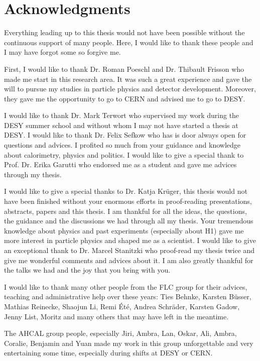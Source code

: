 \cleardoublepage
\thispagestyle{empty}
{}
\chapter*{Acknowledgments}

Everything leading up to this thesis would not have been possible without the continuous support of many people. Here, I would like to thank these people and I may have forgot some so forgive me.

First, I would like to thank Dr. Roman Poeschl and Dr. Thibault Frisson who made me start in this research area. It was such a great experience and gave the will to pursue my studies in particle physics and detector development. Moreover, they gave me the opportunity to go to CERN and advised me to go to DESY.

I would like to thank Dr. Mark Terwort who supervised my work during the DESY summer school and without whom I may not have started a thesis at DESY. I would like to thank Dr. Felix Sefkow who has is door always open for questions and advices. I profited so much from your guidance and knowledge about calorimetry, physics and politics. I would like to give a special thank to Prof. Dr. Erika Garutti who endorsed me as a student and gave me advices through my thesis.

I would like to give a special thanks to Dr. Katja Kr\"uger, this thesis would not have been finished without your enormous efforts in proof-reading presentations, abstracts, papers and this thesis. I am thankful for all the ideas, the questions, the guidance and the discussions we had through all my thesis. Your tremendous knowledge about physics and past experiments (especially about H1) gave me more interest in particle physics and shaped me as a scientist. I would like to give an exceptional thank to Dr. Marcel Stanitzki who proof-read my thesis twice and give me wonderful comments and advices about it. I am also greatly thankful for the talks we had and the joy that you bring with you.

I would like to thank many other people from the FLC group for their advices, teaching and administrative help over these years: Ties Behnke, Karsten B\"usser, Mathias Reinecke, Shaojun Li, Remi \'Et\'e, Andrea Schr\"ader, Karsten Gadow, Jenny List, Moritz and many others that may have left in the meantime.

The AHCAL group people, especially Jiri, Ambra, Lan, Oskar, Ali, Ambra, Coralie, Benjamin and Yuan made my work in this group unforgettable and very entertaining some time, especially during shifts at DESY or CERN.

